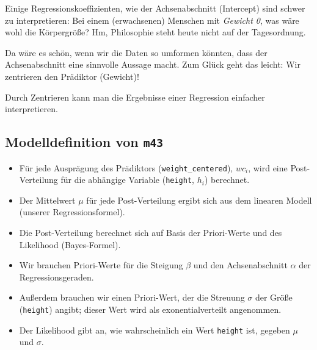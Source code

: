 \documentclass[
  a4paper,
  DIV=11]{scrreprt}
\providecommand{\tightlist}{%
  \setlength{\itemsep}{0pt}\setlength{\parskip}{0pt}}\usepackage{longtable,booktabs,array}
\theoremstyle{definition}
\theoremstyle{remark}
\begin{document}
Einige Regressionskoeffizienten, wie der Achsenabschnitt (Intercept)
sind schwer zu interpretieren: Bei einem (erwachsenen) Menschen mit
\emph{Gewicht 0}, was wäre wohl die Körpergröße? Hm, Philosophie steht
heute nicht auf der Tagesordnung.

Da wäre es schön, wenn wir die Daten so umformen könnten, dass der
Achsenabschnitt eine sinnvolle Aussage macht. Zum Glück geht das leicht:
Wir zentrieren den Prädiktor (Gewicht)!

\begin{tcolorbox}[enhanced jigsaw, colframe=quarto-callout-important-color-frame, title=\textcolor{quarto-callout-important-color}{\faExclamation}\hspace{0.5em}{Wichtig}, breakable, leftrule=.75mm, coltitle=black, toptitle=1mm, bottomrule=.15mm, bottomtitle=1mm, opacityback=0, arc=.35mm, rightrule=.15mm, left=2mm, colbacktitle=quarto-callout-important-color!10!white, opacitybacktitle=0.6, toprule=.15mm, titlerule=0mm, colback=white]
Durch Zentrieren kann man die Ergebnisse einer Regression einfacher
interpretieren.
\end{tcolorbox}

\hypertarget{modelldefinition-von-m43}{%
\subsection{\texorpdfstring{Modelldefinition von
\texttt{m43}}{Modelldefinition von m43}}\label{modelldefinition-von-m43}}

\begin{itemize}
\tightlist
\item
  Für jede Ausprägung des Prädiktors (\texttt{weight\_centered}),
  \(wc_i\), wird eine Post-Verteilung für die abhängige Variable
  (\texttt{height}, \(h_i\)) berechnet.
\item
  Der Mittelwert \(\mu\) für jede Post-Verteilung ergibt sich aus dem
  linearen Modell (unserer Regressionsformel).
\item
  Die Post-Verteilung berechnet sich auf Basis der Priori-Werte und des
  Likelihood (Bayes-Formel).
\item
  Wir brauchen Priori-Werte für die Steigung \(\beta\) und den
  Achsenabschnitt \(\alpha\) der Regressionsgeraden.
\item
  Außerdem brauchen wir einen Priori-Wert, der die Streuung \(\sigma\)
  der Größe (\texttt{height}) angibt; dieser Wert wird als
  exonentialverteilt angenommen.
\item
  Der Likelihood gibt an, wie wahrscheinlich ein Wert \texttt{height}
  ist, gegeben \(\mu\) und \(\sigma\).
\end{itemize}
\end{document}
